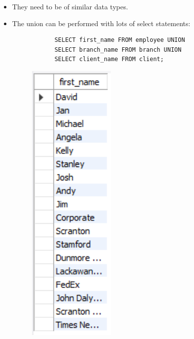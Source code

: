 \begin{itemize}
    \item They need to be of similar data types.
    \item The union can be performed with lots of select statements:
        \begin{verbatim}
            SELECT first_name FROM employee UNION
            SELECT branch_name FROM branch UNION
            SELECT client_name FROM client;
        \end{verbatim}
        \begin{figure}[H]
            \centering
            \includegraphics[width=0.4\textwidth]{./Figs/2020-12-24-21-03-42.png}
        \end{figure}
    

\end{itemize}
